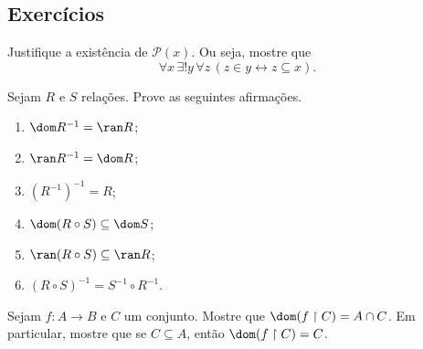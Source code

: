 \subsection*{Exercícios}
\begin{exercise}[$Z^-$]\label{exr:existenciaDaPotencia}
    Justifique a existência de $\mathcal P(x)$.
    Ou seja, mostre que
    \[
        \forall x\, \exists! y\, \forall z\, (z \in y \leftrightarrow z \subseteq x).
    \]
\end{exercise}
\begin{exercise}[$\BST$]
    Sejam $R$ e $S$ relações.
    Prove as seguintes afirmações.
    \begin{enumerate}[label=(\alph*)]
        \item $\dom R^{-1} = \ran R$;
        \item $\ran R^{-1} = \dom R$;
        \item $(R^{-1})^{-1} = R$;
        \item $\dom(R\circ S) \subseteq \dom S$;
        \item $\ran(R\circ S) \subseteq \ran R$;
        \item $(R\circ S)^{-1} = S^{-1}\circ R^{-1}$.
    \end{enumerate}
\end{exercise}

\begin{exercise}[$\BST$]
    Sejam $f:A\to B$ e $C$ um conjunto.
    Mostre que $\dom (f\restriction C) = A\cap C$.
    Em particular, mostre que se $C \subseteq A$, então $\dom (f\restriction C) = C$.
\end{exercise}

